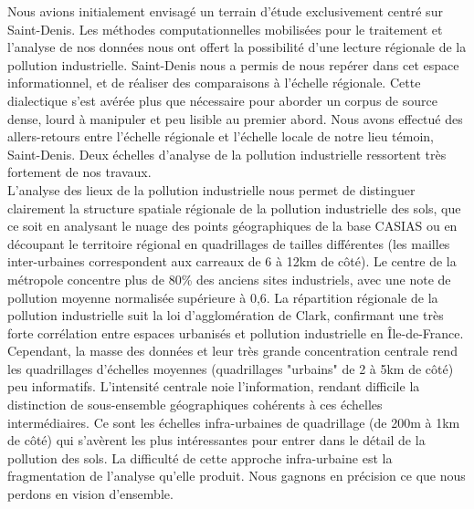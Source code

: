 \documentclass[a4paper,twoside,12pt]{book}
\begin{document}
Nous avions initialement envisagé un terrain d'étude exclusivement centré sur Saint-Denis. Les méthodes computationnelles mobilisées pour le traitement et l'analyse de nos données nous ont offert la possibilité d'une lecture régionale de la pollution industrielle. Saint-Denis nous a permis de nous repérer dans cet espace informationnel, et de réaliser des comparaisons à l'échelle régionale. Cette dialectique s'est avérée plus que nécessaire pour aborder un corpus de source dense, lourd à manipuler et peu lisible au premier abord. Nous avons effectué des allers-retours entre l'échelle régionale et l'échelle locale de notre lieu témoin, Saint-Denis. Deux échelles d'analyse de la pollution industrielle ressortent très fortement de nos travaux. \\

L'analyse des lieux de la pollution industrielle nous permet de distinguer clairement la structure spatiale régionale de la pollution industrielle des sols, que ce soit en analysant le nuage des points géographiques de la base CASIAS ou en découpant le territoire régional en quadrillages de tailles différentes (les mailles inter-urbaines correspondent aux carreaux de 6 à 12km de côté). Le centre de la métropole concentre plus de 80\% des anciens sites industriels, avec une note de pollution moyenne normalisée supérieure à 0,6. La répartition régionale de la pollution industrielle suit la loi d'agglomération de Clark, confirmant une très forte corrélation entre espaces urbanisés et pollution industrielle en Île-de-France. \\

Cependant, la masse des données et leur très grande concentration centrale rend les quadrillages d'échelles moyennes (quadrillages "urbains" de 2 à 5km de côté) peu informatifs. L'intensité centrale noie l'information, rendant difficile la distinction de sous-ensemble géographiques cohérents à ces échelles intermédiaires. Ce sont les échelles infra-urbaines de quadrillage (de 200m à 1km de côté)  qui s'avèrent les plus intéressantes pour entrer dans le détail de la pollution des sols. La difficulté de cette approche infra-urbaine est la fragmentation de l'analyse qu'elle produit. Nous gagnons en précision ce que nous perdons en vision d'ensemble. \\
\end{document}
